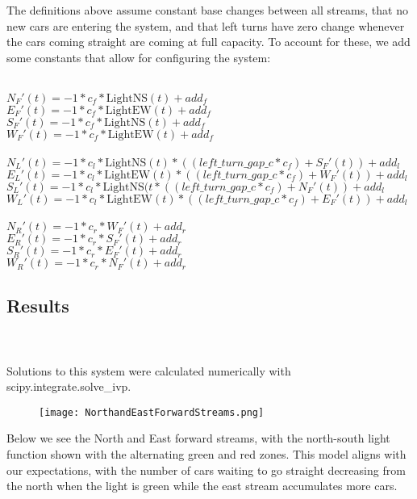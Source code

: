 \documentclass[12pt]{article}
\begin{document}
The definitions above assume constant base changes between all streams, that no new cars are entering the system, and that left turns have zero change whenever the cars coming straight are coming at full capacity. To account for these, we add some constants that allow for configuring the system:\\\\
\begin{left}
    $N_F'(t) = -1*c_f*\text{LightNS}(t)+add_f$\\
    $E_F'(t) = -1*c_f*\text{LightEW}(t)+add_f$\\
    $S_F'(t) = -1*c_f*\text{LightNS}(t)+add_f$\\
    $W_F'(t) = -1*c_f*\text{LightEW}(t)+add_f$\\\\
    $N_L'(t) = -1*c_l*\text{LightNS}(t)*((left\_turn\_gap\_c*c_f) + S_F'(t)) + add_l$\\
    $E_L'(t) = -1*c_l*\text{LightEW}(t)*((left\_turn\_gap\_c*c_f) + W_F'(t)) + add_l$\\
    $S_L'(t) = -1*c_l*\text{LightNS}(t*((left\_turn\_gap\_c*c_f) + N_F'(t)) + add_l$\\
    $W_L'(t) = -1*c_l*\text{LightEW}(t)*((left\_turn\_gap\_c*c_f) + E_F'(t)) + add_l$\\\\
    $N_R'(t) = -1*c_r*W_F'(t)+add_r$\\
    $E_R'(t) = -1*c_r*S_F'(t)+add_r$\\
    $S_R'(t) = -1*c_r*E_F'(t)+add_r$\\
    $W_R'(t) = -1*c_r*N_F'(t)+add_r$\\
\end{left}

\subsection{Results}\\\\
Solutions to this system were calculated numerically with scipy.integrate.solve\_ivp.\\


\begin{figure}[h!]
    \centering
    \texttt{[image: NorthandEastForwardStreams.png]}
    \label{fig:diagram}
\end{figure}

Below we see the North and East forward streams, with the north-south light function shown with the alternating green and red zones. This model aligns with our expectations, with the number of cars waiting to go straight decreasing from the north when the light is green while the east stream accumulates more cars.\\
\end{document}
